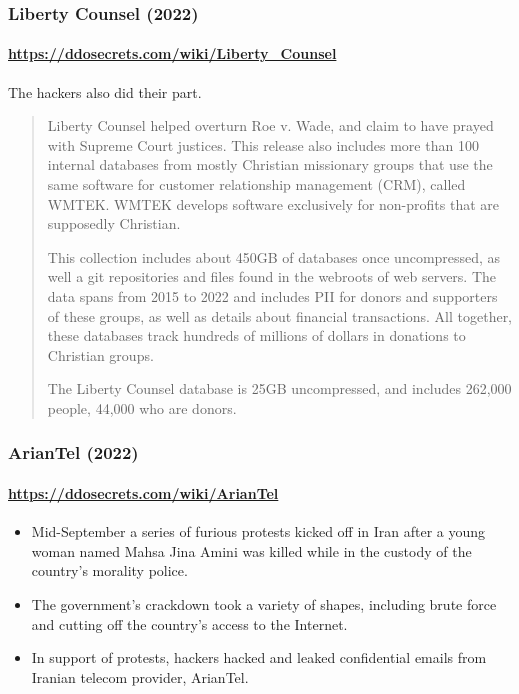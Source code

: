\documentclass[aspectratio=169,usenames,dvipsnames]{beamer}
\begin{document}
\begin{frame}
  \frametitle{Liberty Counsel (2022)}
  \framesubtitle{\url{https://ddosecrets.com/wiki/Liberty_Counsel}}

  The hackers also did their part.

  \footnotesize \pause \par
  \begin{quote}
    Liberty Counsel helped overturn Roe v. Wade, and claim to have prayed with
    Supreme Court justices. This release also includes more than 100 internal
    databases from mostly Christian missionary groups that use the same
    software for customer relationship management (CRM), called WMTEK.
    WMTEK develops software exclusively for non-profits that are supposedly
    Christian.

    \par \pause

    This collection includes about 450GB of databases once uncompressed,
    as well a git repositories and files found in the webroots of web servers.
    The data spans from 2015 to 2022 and includes PII for donors and
    supporters of these groups, as well as details about financial
    transactions. All together, these databases track hundreds of millions
    of dollars in donations to Christian groups.

    \par \pause

    The Liberty Counsel database is 25GB uncompressed, and includes
    262,000 people, 44,000 who are donors.

  \end{quote}

\end{frame}

\begin{frame}
  \frametitle{ArianTel (2022)}
  \framesubtitle{\url{https://ddosecrets.com/wiki/ArianTel}}

  \begin{itemize}[<+->]
    \item Mid-September a series of furious protests kicked off in Iran after
      a young woman named Mahsa Jina Amini was killed while in the custody of
      the country's morality police.
    \item The government's crackdown took a variety of shapes, including
      brute force and cutting off the country's access to the Internet.
    \item In support of protests, hackers hacked and leaked confidential
      emails from Iranian telecom provider, ArianTel.
  \end{itemize}
\end{frame}
\end{document}

